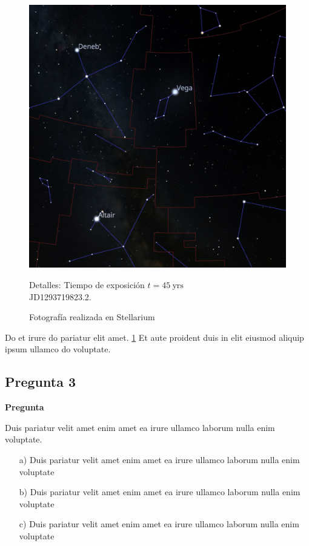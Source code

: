 \begin{figure}[ht!]
    \centering
    \includegraphics[width=12cm]{Resources/img/image.png}
    \caption{Fotografía realizada en Stellarium}{Detalles: Tiempo de exposición $t = 45 \ \text{yrs}$}\\{JD1293719823.2}.
    \label{fig:constelaciones}
\end{figure}

Do et irure do pariatur elit amet. \ref{fig:constelaciones} Et aute proident duis in elit eiusmod aliquip ipsum ullamco do voluptate.


\subsection{Pregunta 3} \label{subsec:pregunta3}

\noindent \textbf{Pregunta} 

Duis pariatur velit amet enim amet ea irure ullamco laborum nulla enim voluptate.

\begin{enumerate}
    \item[a)] Duis pariatur velit amet enim amet ea irure ullamco laborum nulla enim voluptate
    \item[b)] Duis pariatur velit amet enim amet ea irure ullamco laborum nulla enim voluptate
    \item[c)] Duis pariatur velit amet enim amet ea irure ullamco laborum nulla enim voluptate
\end{enumerate}

